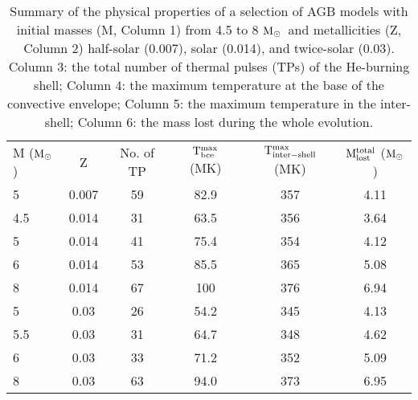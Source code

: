 \documentclass{nature}
\newcommand{\msun}{\ensuremath{{\rm M}_{\odot}}}
\begin{document}
\begin{table*}[h]
\caption{Summary of the physical properties of a selection of AGB models with
initial masses (M, Column 1) from 4.5 to 8 \msun\ and metallicities
(Z, Column 2) half-solar (0.007), solar (0.014), and twice-solar (0.03). 
Column 3: the total number of thermal pulses (TPs) of the He-burning shell;
Column 4: the maximum temperature at the base of the
convective envelope; Column 5: the maximum temperature in the inter-shell;
Column 6: the mass lost during the whole evolution.}
\label{tab:models}
\begin{center}
\vspace{0.5cm}
\begin{tabular}{lccccc} \hline
\hline
M (\msun) & Z & No. of TP & ${\rm T}^{\rm max}_{\rm bce}$ (MK) & 
${\rm T}^{\rm max}_{\rm inter-shell}$ (MK) & 
${\rm M}_{\rm lost}^{\rm total}$ (\msun) \\
5 & 0.007 & 59 & 82.9 & 357 & 4.11 \\
4.5 & 0.014 & 31 & 63.5 & 356 & 3.64 \\
5 & 0.014 & 41 & 75.4 & 354 & 4.12 \\
6 & 0.014 & 53 & 85.5 & 365 & 5.08 \\
8 & 0.014 & 67 & 100 & 376 & 6.94 \\
5 & 0.03 & 26 & 54.2 & 345 & 4.13 \\
5.5 & 0.03 & 31 & 64.7 & 348 & 4.62 \\
6 & 0.03 & 33 & 71.2 & 352 & 5.09 \\
8 & 0.03 & 63 & 94.0 & 373 & 6.95 \\
\hline \hline
\end{tabular}
\end{center}
\end{table*}
\end{document}
